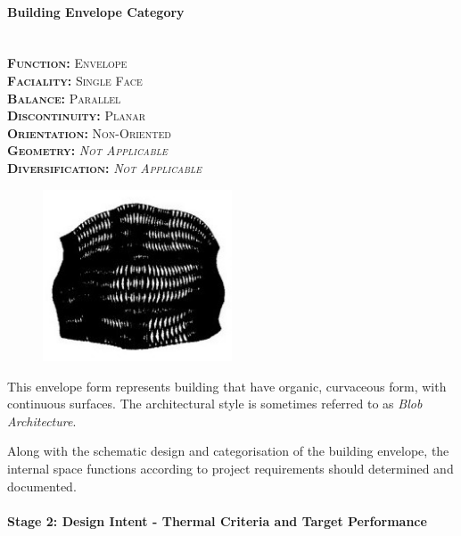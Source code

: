 \setlength{\columnseprule}{0pt}
\begin{multicols}{2}
	\paragraph{Building Envelope Category}\mbox{}\\
	\vspace {0.5cm}	
	\small \textsc{\textbf{Function:} Envelope\\
	\vspace {0.3cm}
	\textbf{Faciality:} Single Face\\
	\vspace {0.3cm}
	\textbf{Balance:} Parallel\\
	\vspace {0.3cm}
	\textbf{Discontinuity:} Planar\\
	\vspace {0.3cm}
	\textbf{Orientation:} Non-Oriented\\
	\vspace {0.3cm}
	\textbf{Geometry:} \emph{Not Applicable}\\
	\vspace {0.3cm}
	\textbf{Diversification:} \emph{Not Applicable}\\}
	\normalsize
	\columnbreak
	\vspace{3.5cm}
	\begin{figure}[H]
		\centering
		\includegraphics[width=0.5\textwidth]{./Images/21-Envelope12}
	\end{figure}
\end{multicols}
\vspace{-5mm}

This envelope form represents building that have organic, curvaceous form, with continuous surfaces. The architectural style is sometimes referred to as \emph{Blob Architecture}.

Along with the schematic design and categorisation of the building envelope, the internal space functions according to project requirements should determined and documented.

\paragraph{Stage 2: Design Intent - Thermal Criteria and Target Performance}\mbox{}\\

